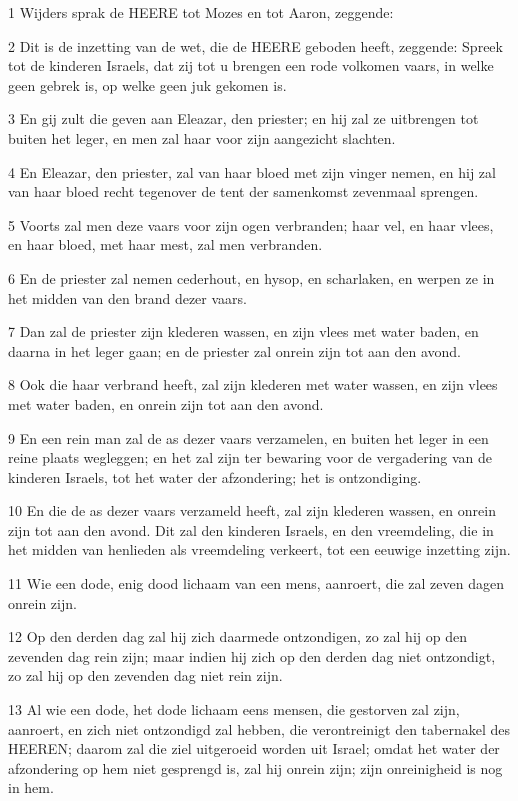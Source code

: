 \par 1 Wijders sprak de HEERE tot Mozes en tot Aaron, zeggende:
\par 2 Dit is de inzetting van de wet, die de HEERE geboden heeft, zeggende: Spreek tot de kinderen Israels, dat zij tot u brengen een rode volkomen vaars, in welke geen gebrek is, op welke geen juk gekomen is.
\par 3 En gij zult die geven aan Eleazar, den priester; en hij zal ze uitbrengen tot buiten het leger, en men zal haar voor zijn aangezicht slachten.
\par 4 En Eleazar, den priester, zal van haar bloed met zijn vinger nemen, en hij zal van haar bloed recht tegenover de tent der samenkomst zevenmaal sprengen.
\par 5 Voorts zal men deze vaars voor zijn ogen verbranden; haar vel, en haar vlees, en haar bloed, met haar mest, zal men verbranden.
\par 6 En de priester zal nemen cederhout, en hysop, en scharlaken, en werpen ze in het midden van den brand dezer vaars.
\par 7 Dan zal de priester zijn klederen wassen, en zijn vlees met water baden, en daarna in het leger gaan; en de priester zal onrein zijn tot aan den avond.
\par 8 Ook die haar verbrand heeft, zal zijn klederen met water wassen, en zijn vlees met water baden, en onrein zijn tot aan den avond.
\par 9 En een rein man zal de as dezer vaars verzamelen, en buiten het leger in een reine plaats wegleggen; en het zal zijn ter bewaring voor de vergadering van de kinderen Israels, tot het water der afzondering; het is ontzondiging.
\par 10 En die de as dezer vaars verzameld heeft, zal zijn klederen wassen, en onrein zijn tot aan den avond. Dit zal den kinderen Israels, en den vreemdeling, die in het midden van henlieden als vreemdeling verkeert, tot een eeuwige inzetting zijn.
\par 11 Wie een dode, enig dood lichaam van een mens, aanroert, die zal zeven dagen onrein zijn.
\par 12 Op den derden dag zal hij zich daarmede ontzondigen, zo zal hij op den zevenden dag rein zijn; maar indien hij zich op den derden dag niet ontzondigt, zo zal hij op den zevenden dag niet rein zijn.
\par 13 Al wie een dode, het dode lichaam eens mensen, die gestorven zal zijn, aanroert, en zich niet ontzondigd zal hebben, die verontreinigt den tabernakel des HEEREN; daarom zal die ziel uitgeroeid worden uit Israel; omdat het water der afzondering op hem niet gesprengd is, zal hij onrein zijn; zijn onreinigheid is nog in hem.
